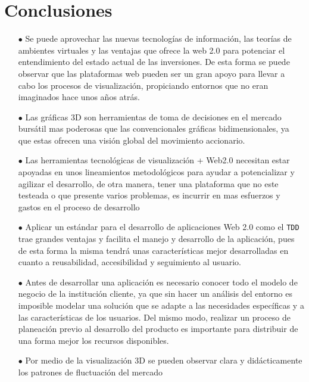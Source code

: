 \chapter{Conclusiones}
\begin{itemize}

\item[$\bullet$] Se puede aprovechar las nuevas tecnologías de información, las teorías de ambientes virtuales y las ventajas que ofrece la web 2.0 para potenciar el entendimiento del estado actual de las inversiones. De esta forma se puede observar que las plataformas web pueden ser un gran apoyo para llevar a cabo los procesos de visualización, propiciando entornos que no eran imaginados hace unos años atrás.

\item[$\bullet$] Las gráficas 3D son herramientas de toma de decisiones en el mercado bursátil mas poderosas que las convencionales gráficas bidimensionales, ya que estas ofrecen una visión global del movimiento accionario.

\item[$\bullet$] Las herramientas tecnológicas de visualización + Web2.0 necesitan estar apoyadas en unos lineamientos metodológicos para ayudar a potencializar y agilizar el desarrollo, de otra manera, tener una plataforma que no este testeada o que presente varios problemas, es incurrir en mas esfuerzos y gastos en el proceso de desarrollo

\item[$\bullet$] Aplicar un estándar para el desarrollo de aplicaciones Web 2.0 como el \texttt{TDD} trae grandes ventajas y facilita el manejo y desarrollo de la aplicación, pues de esta forma la misma tendrá unas características mejor desarrolladas en cuanto a reusabilidad, accesibilidad y seguimiento al usuario.

\item[$\bullet$] Antes de desarrollar una aplicación es necesario conocer todo el modelo de negocio de la institución cliente, ya que sin hacer un análisis del entorno es imposible modelar una solución que se adapte a las necesidades específicas y a las características de los usuarios. Del mismo modo, realizar un proceso de planeación previo al desarrollo del producto es importante para distribuir de una forma mejor los recursos disponibles.

\item[$\bullet$] Por medio de la visualización 3D se pueden observar clara y didácticamente los patrones de fluctuación del mercado	


\end{itemize}
